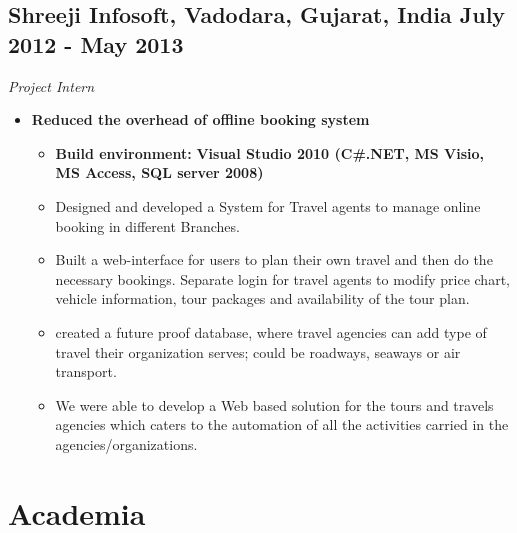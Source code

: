 \documentclass[11pt,letterpaper,sans]{moderncv}        %
\begin{document}
\subsection{\textbf{Shreeji Infosoft}, Vadodara, Gujarat, India \small{July 2012 - May 2013}}
\textit{Project Intern}
\begin {small}

\vspace{5pt}

\begin{itemize}

\item \textbf{Reduced the overhead of offline booking system}
\begin{itemize}
\item \textbf{ Build environment:} \textbf{Visual Studio 2010 (C\#.NET, MS Visio, MS Access, SQL server 2008)}
\vspace{2pt}
\item Designed and developed a System for Travel agents to manage online booking in different Branches.
\vspace{2pt}
\item Built a web-interface for users to plan their own travel and then do the necessary bookings. Separate login for travel agents to modify price chart, vehicle information, tour packages and availability of the tour plan.
\vspace{2pt}
\item created a future proof database, where travel agencies can add type of travel their organization serves; could be roadways, seaways or air transport.
\vspace{2pt}
\item We were able to develop a Web based solution for the tours and travels agencies which caters to the automation of all the activities carried in the agencies/organizations.
\end{itemize}

\end{itemize}
\end{small}

\vspace{5pt}

\pagebreak

\section{Academia}

\vspace{5pt}
\end{document}
